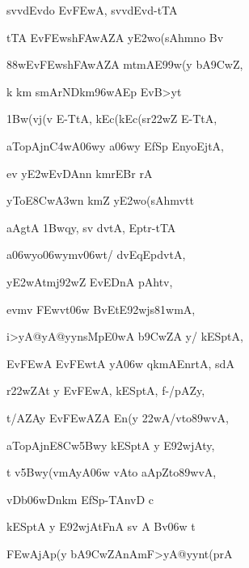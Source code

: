 {\dn sv\0v\?dEvdo Ev\3FEwA, sv\0v\?dEvd-tTA{\dandabdn} \dontdisplaylinenum}

{\dn tTA Ev\3FEwsh\3FAwAZA\2 y\3E2wo(sAhmno Bv\? \vegdn\dontdisplaylinenum}

{\dn {}\388wEv\3FEwsh\3FAwAZA\2 mtmAE\399w(y b\5A\39CwZ\4,{\dandabdn} \dontdisplaylinenum}

{\dn k km\0 smArNDkm\0\396wAEp EvB>yt\? \vegdn\dontdisplaylinenum}

{\dn \31Bw(vj(v\? E-TtA, k\?Ec(k\?Ec(s\2r\322wZ\? E-TtA,{\dandabdn} \dontdisplaylinenum}

{\dn aTo{\qvb}pAj\0n\3C4wA\306wy\? a\306wy\? EfSp\? EnyoEjtA, \vegdn\dontdisplaylinenum}

{\dn ev\2 y\3E2wEvDAn\?n k\0mr\?EBr\? rA{\dandabdn} \dontdisplaylinenum}

{\dn yToE\38Cw\3A3w\?n km\?{\qvb}Z y\3E2wo(sAhmvt\0t \vegdn\dontdisplaylinenum}

{\dn aAgtA \31Bwqy, sv\?{\qvb} d\?vtA, Eptr-tTA{\dandabdn} \dontdisplaylinenum}

{\dn a\306wyo\306wym\5v\306wt/ d\?vEq\0Epd\?vtA, \vegdn\dontdisplaylinenum}

{\dn y\3E2wAt\0mj\392wZ{\rdt} EvEDnA pAh\?tv,{\dandabdn} \dontdisplaylinenum}

{\dn evm\?v \3FEwvt\0\306w BvEtE\392w\0js\381wmA, \vegdn\dontdisplaylinenum}

{\dn i>yA@yA@yynsMp\3E0wA b\5\39CwZA y/ kESptA,{\dandabdn} \dontdisplaylinenum}

{\dn {}Ev\3FEwA Ev\3FEwtA\2 yA\306w qkmA\0EnrtA, sdA \vegdn\dontdisplaylinenum}

{\dn r\322wZAt{\rdt}  y\? Ev\3FEwA, kESptA, f-/pAZy,{\dandabdn} \dontdisplaylinenum}

{\dn {}t/AZAy Ev\3FEwAZA\2 En(y\2 \322wA/v\5to\389wvA, \vegdn\dontdisplaylinenum}

{\dn aTo{\qvb}pAj\0nE\38Cw\35Bwy kESptA y\? E\392wjAty,{\dandabdn} \dontdisplaylinenum}

{\dn t\?  v\4\35Bwy(vmAyA\306w vAto{\qvb} aApZto\389wvA,{\dandadn}\dontdisplaylinenum }

{\dn vDb\306wDnkm\?{\qvb} EfSp-TAnvD\? c \vegdn\dontdisplaylinenum}

{\dn kESptA y\? E\392wjAtFnA\2 sv\?{\qvb} A Bv\306w t\?{\dandabdn} \dontdisplaylinenum}

{\dn \3FEwAjAp(y\2 b\5A\39CwZAnAmF>yA@yynt(prA \vegdn\dontdisplaylinenum}

